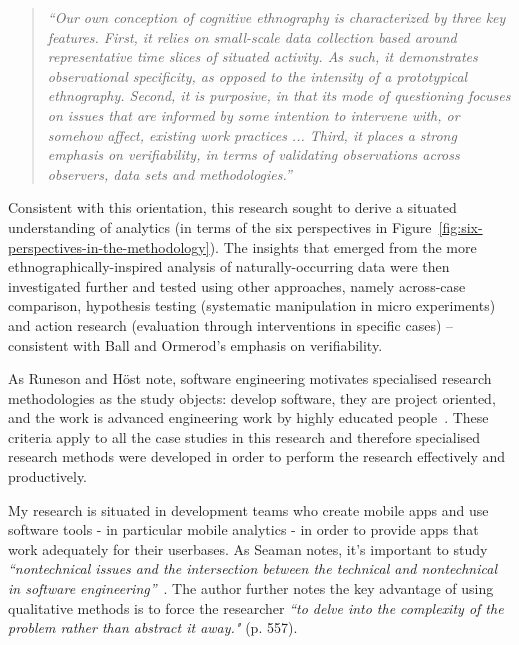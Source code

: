\begin{quote}
  \textit{``Our own conception of cognitive ethnography is characterized by three key features. First, it relies on small-scale data collection based around representative time slices of situated activity. As such, it demonstrates observational specificity, as opposed to the intensity of a prototypical ethnography. Second, it is purposive, in that its mode of questioning focuses on issues that are informed by some intention to intervene with, or somehow affect, existing work practices ... Third, it places a strong emphasis on verifiability, in terms of validating observations across observers, data sets and methodologies.''}   ~\citep[p.152]{ball2000_putting_ethnography_to_work_cognitive_ethnography} 
\end{quote} %

Consistent with this orientation, this research sought to derive a situated understanding of analytics (in terms of the six perspectives in Figure~\ref{fig:six-perspectives-in-the-methodology}). The insights that emerged from the more ethnographically-inspired analysis of naturally-occurring data were then investigated further and tested using other approaches, namely across-case comparison, hypothesis testing (systematic manipulation in micro experiments) and action research (evaluation through interventions in specific cases) -- consistent with Ball and Ormerod's emphasis on verifiability.  

As Runeson and Höst note, software engineering motivates specialised research methodologies as the study objects: develop software, they are project oriented, and the work is advanced engineering work by highly educated people~\citep[pp. 132-133]{runeson_2008_guidelines_for_conducting_and_reporting_case_study_research_in_sw_eng}. %
These criteria apply to all the case studies in this research and therefore specialised research methods were developed in order to perform the research effectively and productively. 

My research is situated in development teams who create mobile apps and use software tools - in particular mobile analytics - in order to provide apps that work adequately for their userbases. As Seaman notes, it's important to study \emph{``nontechnical issues and the intersection between the technical and nontechnical in software engineering''}~\citep[p. 557]{seaman1999_qualitative_methods_in_esse}. The author further notes the key advantage of using qualitative methods is to force the researcher \emph{``to delve into the complexity of the problem rather than abstract it away."} (p. 557).

